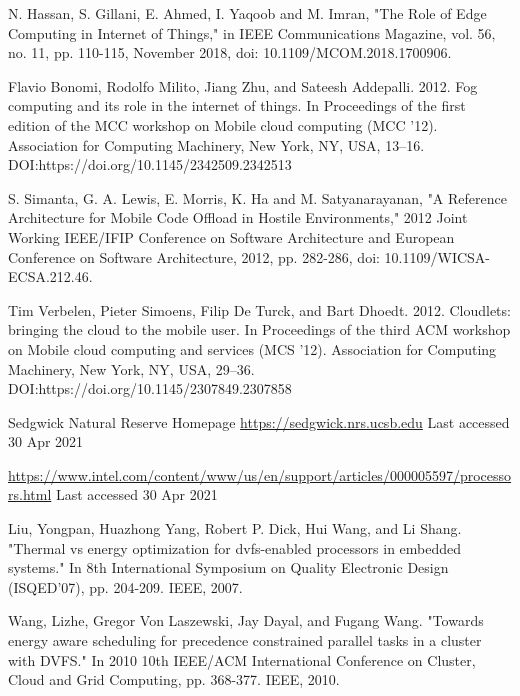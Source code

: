 \documentclass[runningheads]{llncs}
\begin{document}
\begin{thebibliography}{8}

N. Hassan, S. Gillani, E. Ahmed, I. Yaqoob and M. Imran, "The Role of Edge Computing in Internet of Things," in IEEE Communications Magazine, vol. 56, no. 11, pp. 110-115, November 2018, doi: 10.1109/MCOM.2018.1700906.

Flavio Bonomi, Rodolfo Milito, Jiang Zhu, and Sateesh Addepalli. 2012. Fog computing and its role in the internet of things. In Proceedings of the first edition of the MCC workshop on Mobile cloud computing (MCC '12). Association for Computing Machinery, New York, NY, USA, 13–16. DOI:https://doi.org/10.1145/2342509.2342513


S. Simanta, G. A. Lewis, E. Morris, K. Ha and M. Satyanarayanan, "A Reference Architecture for Mobile Code Offload in Hostile Environments," 2012 Joint Working IEEE/IFIP Conference on Software Architecture and European Conference on Software Architecture, 2012, pp. 282-286, doi: 10.1109/WICSA-ECSA.212.46.

Tim Verbelen, Pieter Simoens, Filip De Turck, and Bart Dhoedt. 2012. Cloudlets: bringing the cloud to the mobile user. In Proceedings of the third ACM workshop on Mobile cloud computing and services (MCS '12). Association for Computing Machinery, New York, NY, USA, 29–36. DOI:https://doi.org/10.1145/2307849.2307858

Sedgwick Natural Reserve Homepage \url{https://sedgwick.nrs.ucsb.edu} Last accessed 30 Apr 2021

\url{https://www.intel.com/content/www/us/en/support/articles/000005597/processors.html} Last accessed 30 Apr 2021 


Liu, Yongpan, Huazhong Yang, Robert P. Dick, Hui Wang, and Li Shang. "Thermal vs energy optimization for dvfs-enabled processors in embedded systems." In 8th International Symposium on Quality Electronic Design (ISQED'07), pp. 204-209. IEEE, 2007.


Wang, Lizhe, Gregor Von Laszewski, Jay Dayal, and Fugang Wang. "Towards energy aware scheduling for precedence constrained parallel tasks in a cluster with DVFS." In 2010 10th IEEE/ACM International Conference on Cluster, Cloud and Grid Computing, pp. 368-377. IEEE, 2010.


\end{thebibliography}
\end{document}
